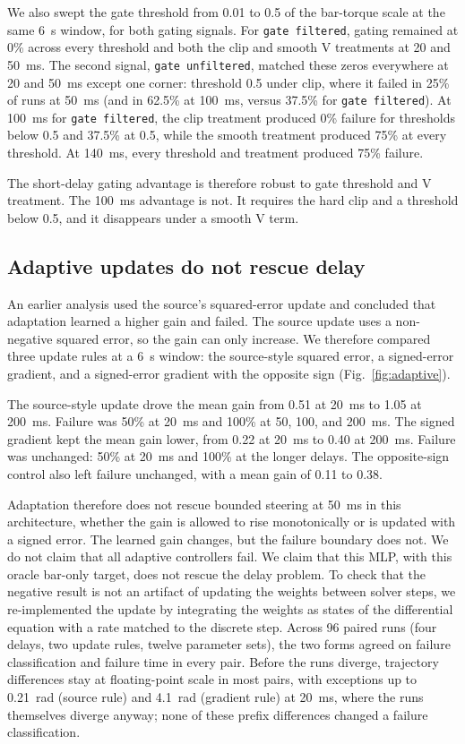 \documentclass[pdflatex,sn-nature]{sn-jnl}
\begin{document}
We also swept the gate threshold from 0.01 to 0.5 of the bar-torque scale at the same 6~s window, for both gating signals. For \texttt{gate filtered}, gating remained at 0\% across every threshold and both the clip and smooth V treatments at 20 and 50~ms. The second signal, \texttt{gate unfiltered}, matched these zeros everywhere at 20 and 50~ms except one corner: threshold 0.5 under clip, where it failed in 25\% of runs at 50~ms (and in 62.5\% at 100~ms, versus 37.5\% for \texttt{gate filtered}). At 100~ms for \texttt{gate filtered}, the clip treatment produced 0\% failure for thresholds below 0.5 and 37.5\% at 0.5, while the smooth treatment produced 75\% at every threshold. At 140~ms, every threshold and treatment produced 75\% failure.

The short-delay gating advantage is therefore robust to gate threshold and V treatment. The 100~ms advantage is not. It requires the hard clip and a threshold below 0.5, and it disappears under a smooth V term.

\subsection{Adaptive updates do not rescue delay}

An earlier analysis used the source's squared-error update and concluded that adaptation learned a higher gain and failed. The source update uses a non-negative squared error, so the gain can only increase. We therefore compared three update rules at a 6~s window: the source-style squared error, a signed-error gradient, and a signed-error gradient with the opposite sign (Fig.~\ref{fig:adaptive}).

The source-style update drove the mean gain from 0.51 at 20~ms to 1.05 at 200~ms. Failure was 50\% at 20~ms and 100\% at 50, 100, and 200~ms. The signed gradient kept the mean gain lower, from 0.22 at 20~ms to 0.40 at 200~ms. Failure was unchanged: 50\% at 20~ms and 100\% at the longer delays. The opposite-sign control also left failure unchanged, with a mean gain of 0.11 to 0.38.

Adaptation therefore does not rescue bounded steering at 50~ms in this architecture, whether the gain is allowed to rise monotonically or is updated with a signed error. The learned gain changes, but the failure boundary does not. We do not claim that all adaptive controllers fail. We claim that this MLP, with this oracle bar-only target, does not rescue the delay problem. To check that the negative result is not an artifact of updating the weights between solver steps, we re-implemented the update by integrating the weights as states of the differential equation with a rate matched to the discrete step. Across 96 paired runs (four delays, two update rules, twelve parameter sets), the two forms agreed on failure classification and failure time in every pair. Before the runs diverge, trajectory differences stay at floating-point scale in most pairs, with exceptions up to 0.21~rad (source rule) and 4.1~rad (gradient rule) at 20~ms, where the runs themselves diverge anyway; none of these prefix differences changed a failure classification.
\end{document}
